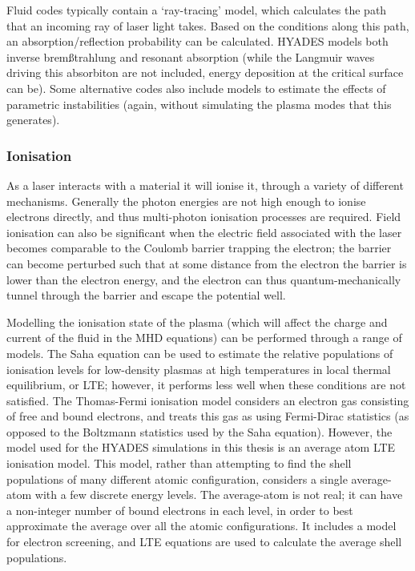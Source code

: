 Fluid codes typically contain a `ray-tracing' model, which calculates the path that an incoming ray of laser light takes. Based on the conditions along this path, an absorption/reflection probability can be calculated. HYADES models both inverse brem{\ss}trahlung and resonant absorption (while the Langmuir waves driving this absorbiton are not included, energy deposition at the critical surface can be). Some alternative codes also include models to estimate the effects of parametric instabilities (again, without simulating the plasma modes that this generates).

\subsubsection{Ionisation}
As a laser interacts with a material it will ionise it, through a variety of different mechanisms. Generally the photon energies are not high enough to ionise electrons directly, and thus multi-photon ionisation processes are required. Field ionisation can also be significant when the electric field associated with the laser becomes comparable to the Coulomb barrier trapping the electron; the barrier can become perturbed such that at some distance from the electron the barrier is lower than the electron energy, and the electron can thus quantum-mechanically tunnel through the barrier and escape the potential well.

Modelling the ionisation state of the plasma (which will affect the charge and current of the fluid in the MHD equations) can be performed through a range of models. The Saha equation can be used to estimate the relative populations of ionisation levels for low-density plasmas at high temperatures in local thermal equilibrium, or LTE; however, it performs less well when these conditions are not satisfied. The Thomas-Fermi ionisation model considers an electron gas consisting of free and bound electrons, and treats this gas as using Fermi-Dirac statistics (as opposed to the Boltzmann statistics used by the Saha equation). However, the model used for the HYADES simulations in this thesis is an average atom LTE ionisation model. This model, rather than attempting to find the shell populations of many different atomic configuration, considers a single average-atom with a few discrete energy levels. The average-atom is not real; it can have a non-integer number of bound electrons in each level, in order to best approximate the average over all the atomic configurations. It includes a model for electron screening, and LTE equations are used to calculate the average shell populations. 

